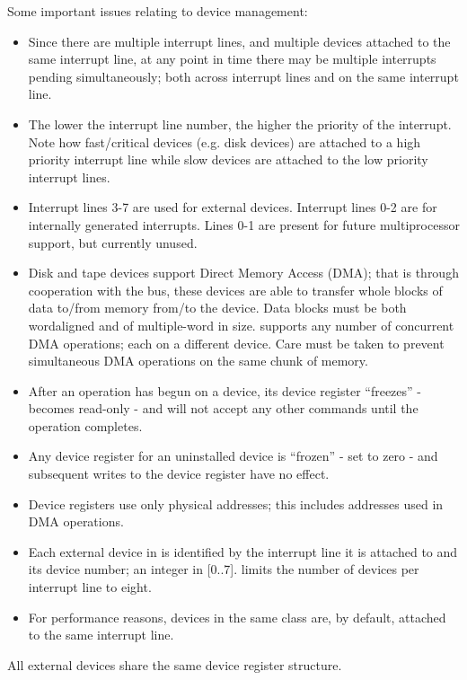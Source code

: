 Some important issues relating to device management:
\begin{itemize}
	\item Since there are multiple interrupt lines, and multiple devices attached to the same interrupt line, at any point in time there may be multiple interrupts pending simultaneously; both across interrupt lines and on the same interrupt line.
	\item The lower the interrupt line number, the higher the priority of the interrupt.
		Note how fast/critical devices (e.g. disk devices) are attached to a high priority interrupt line while slow devices are attached to the low priority interrupt lines.
	\item Interrupt lines 3-7 are used for external devices. Interrupt lines 0-2 are for internally generated interrupts.
		Lines 0-1 are present for future multiprocessor support, but currently unused.
	\item Disk and tape devices support Direct Memory Access (DMA); that is through cooperation with the bus, these devices are able to transfer whole blocks of data to/from memory from/to the device. 
		Data blocks must be both wordaligned and of multiple-word in size. 
		\uarm{} supports any number of concurrent DMA operations; each on a different device. 
		Care must be taken to prevent simultaneous DMA operations on the same chunk of memory.
	\item After an operation has begun on a device, its device register “freezes” - becomes read-only - and will not accept any other commands until the operation completes.
	\item Any device register for an uninstalled device is “frozen” - set to zero - and subsequent writes to the device register have no effect.
	\item Device registers use only physical addresses; this includes addresses used in DMA operations.
	\item Each external device in \uarm{} is identified by the interrupt line it is attached to and its device number; an integer in [0..7]. 
		\uarm{} limits the number of devices per interrupt line to eight.
	\item For performance reasons, devices in the same class are, by default, attached to the same interrupt line.
\end{itemize}



All external devices share the same device register structure.

